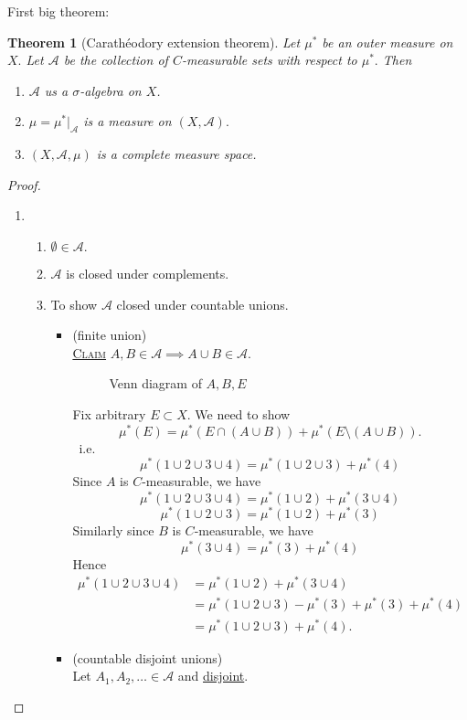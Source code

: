 \documentclass{report}
\newcommand{\ie}{\ i.e.\ }
\newcommand{\fancyem}[1]{\underline{\textsc{#1}}}
\newtheorem{theorem}{Theorem}[chapter]
\theoremstyle{definition}
\theoremstyle{remark}
\begin{document}
First big theorem:
\begin{theorem}[Carathéodory extension theorem]
Let $\mu^*$ be an outer measure on $X.$ Let $\mathcal{A}$ be the collection of $C$-measurable sets with respect to $\mu^*.$ Then
\begin{enumerate}
\item
	$\mathcal{A}$ us a $\sigma$-algebra on $X$.
\item
	$\mu = \mu^*|_{\mathcal{A}}$ is a measure on $(X, \mathcal{A}).$
\item
	$(X, \mathcal{A}, \mu)$ is a complete measure space.
\end{enumerate}
\end{theorem}
\begin{proof}
\begin{enumerate}
\item
	\begin{enumerate}
	\item
		$\emptyset \in \mathcal{A}.$
	\item
		$\mathcal{A}$ is closed under complements.
	\item
		To show $\mathcal{A}$ closed under countable unions.
		\begin{itemize}
		\item(finite union)\\
		\fancyem{Claim} $A, B \in \mathcal{A} \implies A \cup B \in \mathcal{A}.$
		
		\begin{figure}[h]
		\centering
		\label{fig:AB}
		\caption{Venn diagram of $A, B, E$}
		\end{figure}
		
		Fix arbitrary $E \subset X$. We need to show 
		\[
			\mu^*(E) = \mu^*(E \cap (A \cup B)) + \mu^*(E \setminus (A \cup B)).		
		\]
		\ie
		\[
			\mu^*(1 \cup 2 \cup 3 \cup 4) = \mu^*(1 \cup 2 \cup 3) + \mu^*(4)
		\]
		Since $A$ is $C$-measurable, we have
		\[
			\mu^*(1 \cup 2 \cup 3 \cup 4) = \mu^*(1 \cup 2) + \mu^*(3 \cup 4)
		\]
		\[
			\mu^*(1 \cup 2 \cup 3) = \mu^*(1 \cup 2) + \mu^*(3)
		\]
		Similarly since $B$ is $C$-measurable, we have
		\[
			\mu^*(3 \cup 4) = \mu^*(3) + \mu^*(4)
		\]
		Hence
		\begin{align*}
		\mu^*(1 \cup 2 \cup 3 \cup 4)
		& = \mu^*(1 \cup 2) + \mu^*(3 \cup 4) \\
		& = \mu^*(1 \cup 2 \cup 3) - \mu^*(3) + \mu^*(3) + \mu^*(4) \\
		& = \mu^*(1 \cup 2 \cup 3) + \mu^*(4).
		\end{align*}
		\item(countable disjoint unions)\\
		Let $A_1, A_2, \ldots \in \mathcal{A}$ and \underline{disjoint}.
		

\end{itemize}
\end{enumerate}
\end{enumerate}
\end{proof}
\end{document}
